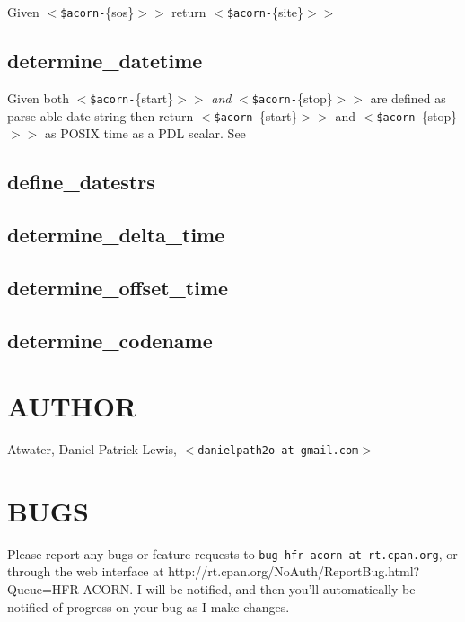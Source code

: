 Given \texttt{$<$\$acorn-}\{sos\}$>$$>$ return \texttt{$<$\$acorn-}\{site\}$>$$>$

\subsection*{determine\_datetime\label{determine_datetime}}


Given both \texttt{$<$\$acorn-}\{start\}$>$$>$ \textit{and} \texttt{$<$\$acorn-}\{stop\}$>$$>$ are defined as parse-able date-string then
return \texttt{$<$\$acorn-}\{start\}$>$$>$ and \texttt{$<$\$acorn-}\{stop\}$>$$>$ as POSIX time as a PDL scalar.
See

\subsection*{define\_datestrs\label{define_datestrs}}
\subsection*{determine\_delta\_time\label{determine_delta_time}}
\subsection*{determine\_offset\_time\label{determine_offset_time}}
\subsection*{determine\_codename\label{determine_codename}}
\section{AUTHOR\label{AUTHOR}}


Atwater, Daniel Patrick Lewis, \texttt{$<$danielpath2o at gmail.com$>$}

\section{BUGS\label{BUGS}}


Please report any bugs or feature requests to \texttt{bug-hfr-acorn at rt.cpan.org}, or through
the web interface at \textsf{http://rt.cpan.org/NoAuth/ReportBug.html?Queue=HFR-ACORN}.  I will be notified, and then you'll
automatically be notified of progress on your bug as I make changes.

